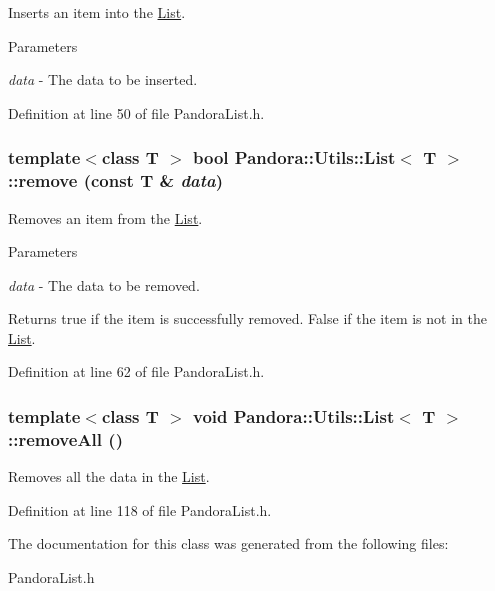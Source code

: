 Inserts an item into the \hyperlink{classPandora_1_1Utils_1_1List}{List}. 
\begin{DoxyParams}{Parameters}
\item[{\em data}]-\/ The data to be inserted. \end{DoxyParams}


Definition at line 50 of file PandoraList.h.\hypertarget{classPandora_1_1Utils_1_1List_a045ecf8edb94f60efc41a5d864c7dca6}{
\subsubsection[{remove}]{\setlength{\rightskip}{0pt plus 5cm}template$<$class T $>$ bool {\bf Pandora::Utils::List}$<$ T $>$::remove (const T \& {\em data})}}
\label{classPandora_1_1Utils_1_1List_a045ecf8edb94f60efc41a5d864c7dca6}


Removes an item from the \hyperlink{classPandora_1_1Utils_1_1List}{List}. 
\begin{DoxyParams}{Parameters}
\item[{\em data}]-\/ The data to be removed. \end{DoxyParams}
\begin{DoxyReturn}{Returns}
true if the item is successfully removed. False if the item is not in the \hyperlink{classPandora_1_1Utils_1_1List}{List}. 
\end{DoxyReturn}


Definition at line 62 of file PandoraList.h.\hypertarget{classPandora_1_1Utils_1_1List_a2dcb0105be0541caf1084c7faa4d1566}{
\subsubsection[{removeAll}]{\setlength{\rightskip}{0pt plus 5cm}template$<$class T $>$ void {\bf Pandora::Utils::List}$<$ T $>$::removeAll ()}}
\label{classPandora_1_1Utils_1_1List_a2dcb0105be0541caf1084c7faa4d1566}


Removes all the data in the \hyperlink{classPandora_1_1Utils_1_1List}{List}. 

Definition at line 118 of file PandoraList.h.

The documentation for this class was generated from the following files:\begin{DoxyCompactItemize}
\item 
PandoraList.h\end{DoxyCompactItemize}
